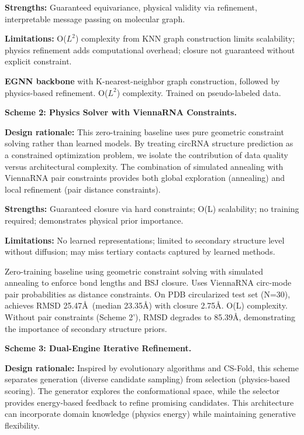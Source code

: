 \documentclass[12pt]{article}
\begin{document}
\textbf{Strengths:} Guaranteed equivariance, physical validity via refinement, interpretable message passing on molecular graph.

\textbf{Limitations:} O($L^2$) complexity from KNN graph construction limits scalability; physics refinement adds computational overhead; closure not guaranteed without explicit constraint.

\textbf{EGNN backbone} with K-nearest-neighbor graph construction, followed by physics-based refinement. O($L^2$) complexity. Trained on pseudo-labeled data.

\textbf{Scheme 2: Physics Solver with ViennaRNA Constraints.}

\textbf{Design rationale:} This zero-training baseline uses pure geometric constraint solving rather than learned models. By treating circRNA structure prediction as a constrained optimization problem, we isolate the contribution of data quality versus architectural complexity. The combination of simulated annealing with ViennaRNA pair constraints provides both global exploration (annealing) and local refinement (pair distance constraints).

\textbf{Strengths:} Guaranteed closure via hard constraints; O(L) scalability; no training required; demonstrates physical prior importance.

\textbf{Limitations:} No learned representations; limited to secondary structure level without diffusion; may miss tertiary contacts captured by learned methods.

Zero-training baseline using geometric constraint solving with simulated annealing to enforce bond lengths and BSJ closure. Uses ViennaRNA circ-mode pair probabilities as distance constraints. On PDB circularized test set (N=30), achieves RMSD 25.47\AA\ (median 23.35\AA) with closure 2.75\AA. O(L) complexity. Without pair constraints (Scheme 2'), RMSD degrades to 85.39\AA, demonstrating the importance of secondary structure priors.

\textbf{Scheme 3: Dual-Engine Iterative Refinement.}

\textbf{Design rationale:} Inspired by evolutionary algorithms and CS-Fold, this scheme separates generation (diverse candidate sampling) from selection (physics-based scoring). The generator explores the conformational space, while the selector provides energy-based feedback to refine promising candidates. This architecture can incorporate domain knowledge (physics energy) while maintaining generative flexibility.
\end{document}
